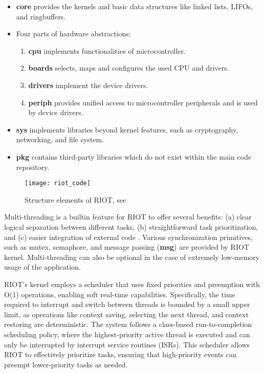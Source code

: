  \begin{itemize}
    \item \textbf{core} provides the kernels and basic data structures like linked lists, LIFOs,
    and ringbuffers.
    \item Four parts of hardware abstractions:
      \begin{enumerate}
        \item \textbf{cpu} implements functionalities of microcontroller.
        \item \textbf{boards} selects, maps and configures the used CPU and drivers.
        \item \textbf{drivers} implement the device drivers.
        \item \textbf{periph} provides unified access to microcontroller peripherals and is used by
        device drivers.
      \end{enumerate}
    \item \textbf{sys} implements libraries beyond kernel features, such as cryptography, networking, and file
    system.
    \item \textbf{pkg} contains third-party libraries which do not exist within the main code 
    repository.
  \end{itemize}

  \begin{figure}[h]
    \centering
    \texttt{[image: riot\_code]}
    \caption{Structure elements of RIOT, see \cite[p.~3]{riot}}
    \label{fig:riot_code}
  \end{figure}

    Multi-threading is a builtin feature for RIOT to offer several benefits: (a) clear 
    logical separation between different tasks, (b) straightforward task prioritization, 
    and (c) easier integration of external code \cite[p.~4]{riot}. Various synchronization primitives, such
    as mutex, semaphore, and message passing (\textbf{msg}) are provided by RIOT kernel.
    Multi-threading can also be optional in the case of extremely low-memory usage of the application.

    RIOT's kernel employs a scheduler that uses fixed priorities and preemption with O(1) operations, 
    enabling soft real-time capabilities. Specifically, the time required to interrupt and switch 
    between threads is bounded by a small upper limit, as operations like context saving, selecting 
    the next thread, and context restoring are deterministic. The system follows a class-based 
    run-to-completion scheduling policy, where the highest-priority active thread is executed and 
    can only be interrupted by interrupt service routines (ISRs). This scheduler allows RIOT to 
    effectively prioritize tasks, ensuring that high-priority events can preempt lower-priority 
    tasks as needed.

